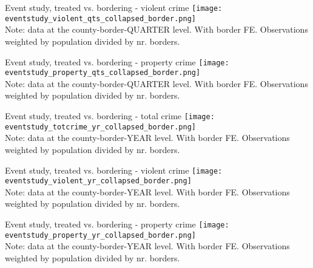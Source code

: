 \documentclass[xcolor=pdftex,dvipsnames,table]{beamer}
\begin{document}
\begin{frame}{Event study, treated vs. bordering - violent crime}
\texttt{[image: eventstudy\_violent\_qts\_collapsed\_border.png]}\\
\tiny{Note: data at the county-border-QUARTER level. With border FE. Observations weighted by population divided by nr. borders.}
\end{frame}

\begin{frame}{Event study, treated vs. bordering - property crime}
\texttt{[image: eventstudy\_property\_qts\_collapsed\_border.png]}\\
\tiny{Note: data at the county-border-QUARTER level. With border FE. Observations weighted by population divided by nr. borders.}
\end{frame}

\begin{frame}{Event study, treated vs. bordering - total crime}
\texttt{[image: eventstudy\_totcrime\_yr\_collapsed\_border.png]}\\
\tiny{Note: data at the county-border-YEAR level. With border FE. Observations weighted by population divided by nr. borders.}
\end{frame}

\begin{frame}{Event study, treated vs. bordering - violent crime}
\texttt{[image: eventstudy\_violent\_yr\_collapsed\_border.png]}\\
\tiny{Note: data at the county-border-YEAR level. With border FE. Observations weighted by population divided by nr. borders.}
\end{frame}

\begin{frame}{Event study, treated vs. bordering - property crime}
\texttt{[image: eventstudy\_property\_yr\_collapsed\_border.png]}\\
\tiny{Note: data at the county-border-YEAR level. With border FE. Observations weighted by population divided by nr. borders.}
\end{frame}
\end{document}
